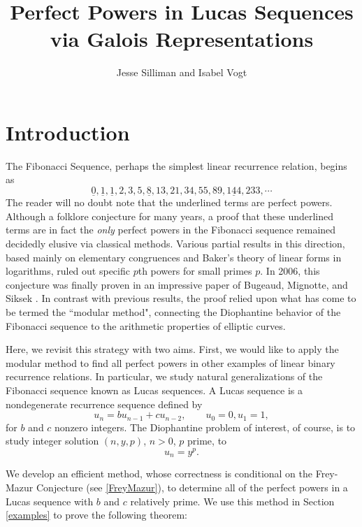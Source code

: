 \documentclass[12pt]{amsart}
\theoremstyle{definition}
\begin{document}
\title{Perfect Powers in Lucas Sequences via Galois Representations}
\author{Jesse Silliman and Isabel Vogt}

\maketitle


\section{Introduction}
The Fibonacci Sequence, perhaps the simplest linear recurrence relation, begins as \[\underline{0},\underline{1},\underline{1},2,3,5,\underline{8},13,21,34,55,89,\underline{144},233, \cdots\] The reader will no doubt note that the underlined terms are perfect powers. Although a folklore conjecture for many years, a proof that these underlined terms are in fact the \emph{only} perfect powers in the Fibonacci sequence remained decidedly elusive via classical methods. Various partial results in this direction, based mainly on elementary congruences and Baker's theory of linear forms in logarithms, ruled out specific $p$th powers for small primes $p$. In 2006, this conjecture was finally proven in an impressive paper of Bugeaud, Mignotte, and Siksek \cite{siksek06}. In contrast with previous results, the proof relied upon what has come to be termed the ``modular method", connecting the Diophantine behavior of the Fibonacci sequence to the arithmetic properties of elliptic curves.

Here, we revisit this strategy with two aims. First, we would like to apply the modular method to find all perfect powers in other examples of linear binary recurrence relations.  In particular, we study natural generalizations of the Fibonacci sequence known as Lucas sequences.  A Lucas sequence is a nondegenerate recurrence sequence defined by \[ u_n = b u_{n-1} + c u_{n-2}, \qquad u_0 = 0, u_1 = 1, \] for $b$ and $c$ nonzero integers.  The Diophantine problem of interest, of course, is to study integer solution $(n,y,p)$, $n > 0$, $p$ prime, to \begin{equation}\label{the_eqn}u_n = y^p.\end{equation}

We develop an efficient method, whose correctness is conditional on the Frey-Mazur Conjecture (see \ref{FreyMazur}), to determine all of the perfect powers in a Lucas sequence with $b$ and $c$ relatively prime.  We use this method in Section \ref{examples} to prove the following theorem:
\end{document}
